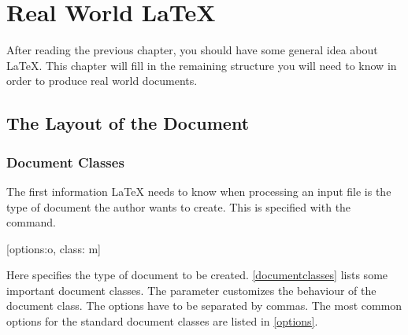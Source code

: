 %
%
%
%


\chapter{Real World \LaTeX{}}\label{chap:realworld}

\begin{intro}
  After reading the previous chapter, you should have some general idea
  about \LaTeX{}. This chapter
  will fill in the remaining structure you will need to know in order
  to produce real world documents.
\end{intro}

\section{The Layout of the Document}

\subsection{Document Classes}\label{sec:documentclass}

The first information \LaTeX{} needs to know when processing an
input file is the type of document the author wants to create. This
is specified with the  command.
\begin{lscommand}
  [options:o, class: m]
\end{lscommand}
Here  specifies the type of document to be created.
\autoref{documentclasses} lists some important document classes. The
 parameter customizes the behaviour of the document class.
The options have to be separated by commas. The most common options for the
standard document classes are listed in \autoref{options}.

